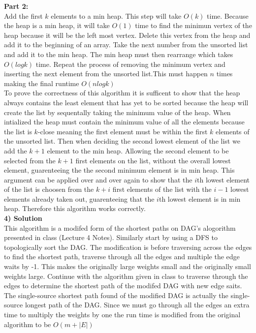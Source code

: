 \documentclass[11pt]{article}
\begin{document}
\textbf{Part 2:}\\
Add the first $k$ elements to a min heap. This step will take $O(k)$ time. Because the heap is a min heap, it will take $O(1)$ time to find the minimun vertex of the heap because it will be the left most vertex. Delete this vertex from the heap and add it to the beginning of an array. Take the next number from the unsorted list and add it to the min heap. The min heap must then rearrange which takes $O(logk)$ time. Repeat the process of removing the minimum vertex and inserting the next element from the unsorted list.This must happen $n$ times making the final runtime $O(nlogk)$ \\
To prove the correctness of this algorithm it is sufficent to show that the heap always contains the least element that has yet to be sorted because the heap will create the list by sequentally taking the minimum value of the heap. When intialized the heap must contain the minimum value of all the elements because the list is $k$-close meaning the first element must be within the first $k$ elements of the unsorted list. Then when deciding the second lowest element of the list we add the $k+1$ element to the min heap. Allowing the second element to be selected from the $k+1$ first elements on the list, without the overall lowest element, guarenteeing the the second minimum element is in min heap. This argument can be applied over and over again to show that the $i$th  lowest element of the list is choosen from the $k+i$ first elements of the list with the $i-1$ lowest elements already taken out, guarenteeing that the $i$th lowest element is in min heap. Therefore this algorithm works correctly.
\\

\textbf{4) Solution}\\
This algorithm is a modifed form of the shortest paths on DAG's alogorithm presented in class (Lecture 4 Notes). Similarly start by using a DFS to topologically sort the DAG. The modification is before traversing across the edges to find the shortest path, traverse through all the edges and multiple the edge waits by -1. This makes the originally large weights small and the originally small weights large. Continue with the algorithm given in class to traverse through the edges to determine the shortest path of the modifed DAG with new edge saits. The single-source shortest path found of the modified DAG is actually the single-source longest path of the DAG. Since we must go through all the edges an extra time to multiply the weights by one the run time is modified from the original algorithm to be $O(m + |E|)$\\
\end{document}
